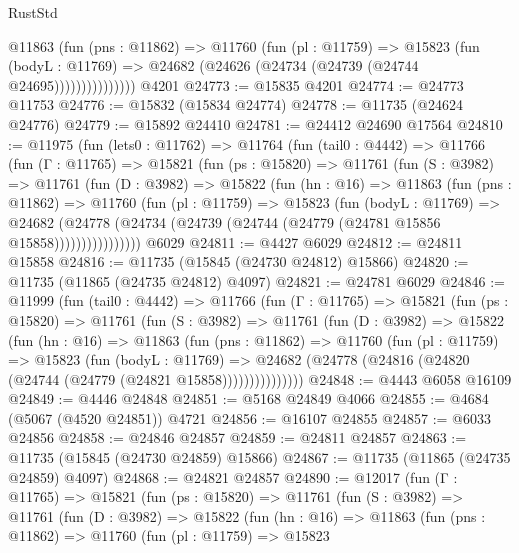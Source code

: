\begin{lexlean}{RustStd}
\begin{coremodule}
                  @11863
                    (fun (pns : @11862) =>
                    @11760
                      (fun (pl : @11759) =>
                      @15823
                        (fun (bodyL : @11769) =>
                        @24682 (@24626 (@24734 (@24739 (@24744 @24695)))))))))))))))
    @4201
@24773 := @15835 @4201
@24774 := @24773 @11753
@24776 := @15832 (@15834 @24774)
@24778 := @11735 (@24624 @24776)
@24779 := @15892 @24410
@24781 := @24412 @24690 @17564
@24810 := @11975
    (fun (lets0 : @11762) =>
    @11764
      (fun (tail0 : @4442) =>
      @11766
        (fun (Γ : @11765) =>
        @15821
          (fun (ps : @15820) =>
          @11761
            (fun (S : @3982) =>
            @11761
              (fun (D : @3982) =>
              @15822
                (fun (hn : @16) =>
                @11863
                  (fun (pns : @11862) =>
                  @11760
                    (fun (pl : @11759) =>
                    @15823
                      (fun (bodyL : @11769) =>
                      @24682
                        (@24778
                          (@24734 (@24739 (@24744 (@24779 (@24781 @15856 @15858))))))))))))))))
    @6029
@24811 := @4427 @6029
@24812 := @24811 @15858
@24816 := @11735 (@15845 (@24730 @24812) @15866)
@24820 := @11735 (@11865 (@24735 @24812) @4097)
@24821 := @24781 @6029
@24846 := @11999
    (fun (tail0 : @4442) =>
    @11766
      (fun (Γ : @11765) =>
      @15821
        (fun (ps : @15820) =>
        @11761
          (fun (S : @3982) =>
          @11761
            (fun (D : @3982) =>
            @15822
              (fun (hn : @16) =>
              @11863
                (fun (pns : @11862) =>
                @11760
                  (fun (pl : @11759) =>
                  @15823
                    (fun (bodyL : @11769) =>
                    @24682 (@24778 (@24816 (@24820 (@24744 (@24779 (@24821 @15858)))))))))))))))
@24848 := @4443 @6058 @16109
@24849 := @4446 @24848
@24851 := @5168 @24849 @4066
@24855 := @4684 (@5067 (@4520 @24851)) @4721
@24856 := @16107 @24855
@24857 := @6033 @24856
@24858 := @24846 @24857
@24859 := @24811 @24857
@24863 := @11735 (@15845 (@24730 @24859) @15866)
@24867 := @11735 (@11865 (@24735 @24859) @4097)
@24868 := @24821 @24857
@24890 := @12017
    (fun (Γ : @11765) =>
    @15821
      (fun (ps : @15820) =>
      @11761
        (fun (S : @3982) =>
        @11761
          (fun (D : @3982) =>
          @15822
            (fun (hn : @16) =>
            @11863
              (fun (pns : @11862) =>
              @11760
                (fun (pl : @11759) =>
                @15823

\end{coremodule}
\end{lexlean}
